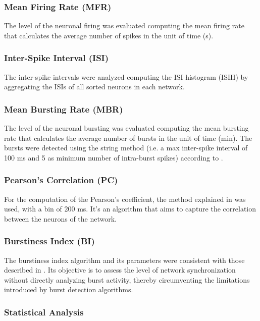 \subsubsection{Mean Firing Rate (MFR)} 

The level of the neuronal firing was evaluated computing the mean firing rate that calculates the average number of spikes in the unit of time (s). 

\subsubsection{Inter-Spike Interval (ISI)}

The inter-spike intervals were analyzed computing the ISI histogram (ISIH) by aggregating the ISIs of all sorted neurons in each network.

\subsubsection{Mean Bursting Rate (MBR)}

The level of the neuronal bursting was evaluated computing the mean bursting rate that calculates the average number of bursts in the unit of time (min). The bursts were detected using the string method (i.e. a max inter-spike interval of 100 ms and 5 as minimum number of intra-burst spikes) according to \cite{Chiappalone2005}.  

\subsubsection{Pearson's Correlation (PC)}

For the computation of the Pearson's coefficient, the method explained in \cite{Selinger2004} was used, with a bin of 200 ms. It's an algorithm that aims to capture the correlation between the neurons of the network.

\subsubsection{Burstiness Index (BI)}

The burstiness index algorithm and its parameters were consistent with those described in \cite{Wagenaar2005}. Its objective is to assess the level of network synchronization without directly analyzing burst activity, thereby circumventing the limitations introduced by burst detection algorithms.

\subsubsection{Statistical Analysis}

